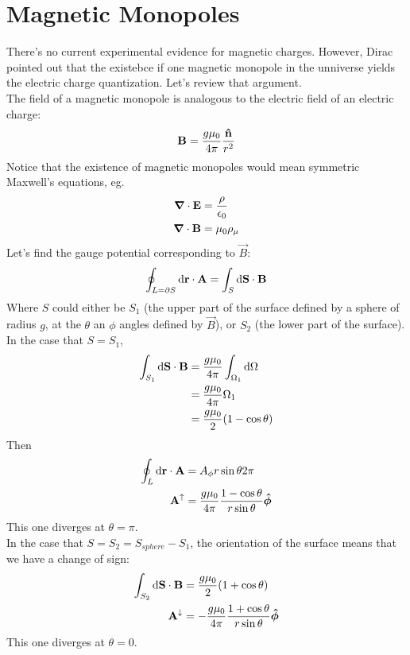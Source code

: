 \documentclass[a4paper]{article}
\begin{document}
\section{Magnetic Monopoles}
There's no current experimental evidence for magnetic charges. However, Dirac
pointed out that the existebce if one magnetic monopole in the unniverse yields
the electric charge quantization. Let's review that argument.\\
The field of a magnetic monopole is analogous to the electric field of an
electric charge:
\[
	\boldsymbol{\mathbf{B}} = \frac{g\mu_0}{4\pi}\frac{\boldsymbol{\mathbf{\hat{n}}}}{r^2}
\]
Notice that the existence of magnetic monopoles would mean symmetric Maxwell's
equations, eg.
\begin{align*}
	\boldsymbol{\mathbf{\nabla}}\cdot\boldsymbol{\mathbf{E}} &= \frac{\rho}{\epsilon_0}\\
	\boldsymbol{\mathbf{\nabla}}\cdot\boldsymbol{\mathbf{B}} &= \mu_0\rho_{\mu}
\end{align*}
Let's find the gauge potential corresponding to $\vec{B}$:
\begin{align*}
	\oint_{L=\partial S} \mathrm{d}\boldsymbol{\mathbf{r}}\cdot\boldsymbol{\mathbf{A}} =
	\int_S \mathrm{d}\boldsymbol{\mathbf{S}}\cdot\boldsymbol{\mathbf{B}}
\end{align*}
Where $S$ could either be $S_1$ (the upper part of the surface defined by a
sphere of radius $g$, at the $\theta$ an $\phi$ angles defined by $\vec{B}$),
or $S_2$ (the lower part of the surface).\\
In the case that $S=S_1$,
\begin{align*}
	\int_{S_1}\mathrm{d}\boldsymbol{\mathbf{S}}\cdot\boldsymbol{\mathbf{B}} &=
	\frac{g\mu_0}{4\pi}\int_{\Omega_1}\mathrm{d}\Omega\\
	&= \frac{g\mu_0}{4\pi}\Omega_1\\
	&= \frac{g\mu_0}{2}(1-\cos\theta)
\end{align*}
Then
\begin{align*}
	\oint_L \mathrm{d}\boldsymbol{\mathbf{r}}\cdot\boldsymbol{\mathbf{A}} &= A_\phi r\sin\theta 2\pi\\
	\boldsymbol{\mathbf{A}}^{\uparrow} &=
	\frac{g\mu_0}{4\pi}\frac{1-\cos\theta}{r\sin\theta}\boldsymbol{\mathbf{\hat{\phi}}}
\end{align*}
This one diverges at $\theta=\pi$.\\
In the case that $S=S_2=S_{sphere}-S_1$, the orientation of the surface means
that we have a change of sign:
\begin{align*}
	\int_{S_2}\mathrm{d}\boldsymbol{\mathbf{S}}\cdot\boldsymbol{\mathbf{B}} &= \frac{g\mu_0}{2}(1+\cos\theta)\\
	\boldsymbol{\mathbf{A}}^{\downarrow} &=
	-\frac{g\mu_0}{4\pi}\frac{1+\cos\theta}{r\sin\theta}\boldsymbol{\mathbf{\hat{\phi}}}
\end{align*}
This one diverges at $\theta=0$.\\
\end{document}
